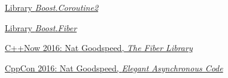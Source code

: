 \begin{thebibliography}{99}
        \href{http://www.boost.org/doc/libs/release/libs/coroutine2/doc/html/index.html}
        {Library \emph{Boost.Coroutine2}}

        \href{http://www.boost.org/doc/libs/release/libs/fiber/doc/html/index.html}
        {Library \emph{Boost.Fiber}}

        \href{https://www.youtube.com/watch?v=gcNphOWuUb0}
        {C++Now 2016: Nat Goodspeed, \emph{The Fiber Library}}

        \href{https://www.youtube.com/watch?v=e-NUmyBou8Q}
        {CppCon 2016: Nat Goodspeed, \emph{Elegant Asynchronous Code}}

\end{thebibliography}
